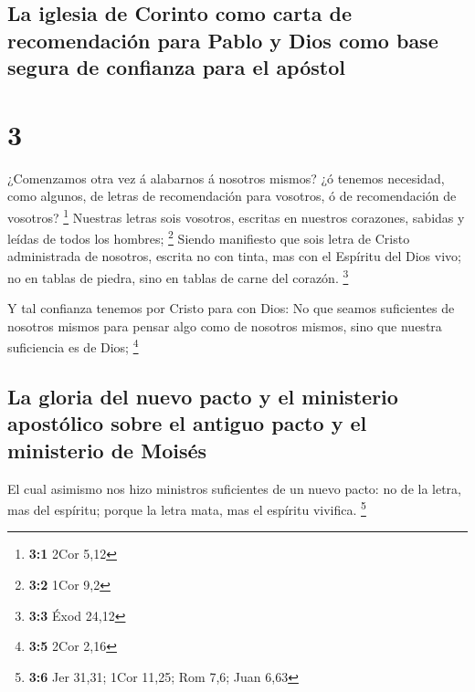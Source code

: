 \hypertarget{la-iglesia-de-corinto-como-carta-de-recomendaciuxf3n-para-pablo-y-dios-como-base-segura-de-confianza-para-el-apuxf3stol}{%
\subsection{La iglesia de Corinto como carta de recomendación para Pablo
y Dios como base segura de confianza para el
apóstol}\label{la-iglesia-de-corinto-como-carta-de-recomendaciuxf3n-para-pablo-y-dios-como-base-segura-de-confianza-para-el-apuxf3stol}}

\hypertarget{section-2}{%
\section{3}\label{section-2}}

 ¿Comenzamos otra vez á alabarnos á nosotros mismos? ¿ó
tenemos necesidad, como algunos, de letras de recomendación para
vosotros, ó de recomendación de vosotros? \footnote{\textbf{3:1} 2Cor
  5,12}  Nuestras letras sois vosotros, escritas en
nuestros corazones, sabidas y leídas de todos los hombres; \footnote{\textbf{3:2}
  1Cor 9,2}  Siendo manifiesto que sois letra de Cristo
administrada de nosotros, escrita no con tinta, mas con el Espíritu del
Dios vivo; no en tablas de piedra, sino en tablas de carne del corazón.
\footnote{\textbf{3:3} Éxod 24,12}

 Y tal confianza tenemos por Cristo para con Dios:
 No que seamos suficientes de nosotros mismos para pensar
algo como de nosotros mismos, sino que nuestra suficiencia es de Dios;
\footnote{\textbf{3:5} 2Cor 2,16}

\hypertarget{la-gloria-del-nuevo-pacto-y-el-ministerio-apostuxf3lico-sobre-el-antiguo-pacto-y-el-ministerio-de-moisuxe9s}{%
\subsection{La gloria del nuevo pacto y el ministerio apostólico sobre
el antiguo pacto y el ministerio de
Moisés}\label{la-gloria-del-nuevo-pacto-y-el-ministerio-apostuxf3lico-sobre-el-antiguo-pacto-y-el-ministerio-de-moisuxe9s}}

 El cual asimismo nos hizo ministros suficientes de un
nuevo pacto: no de la letra, mas del espíritu; porque la letra mata, mas
el espíritu vivifica. \footnote{\textbf{3:6} Jer 31,31; 1Cor 11,25; Rom
  7,6; Juan 6,63}

